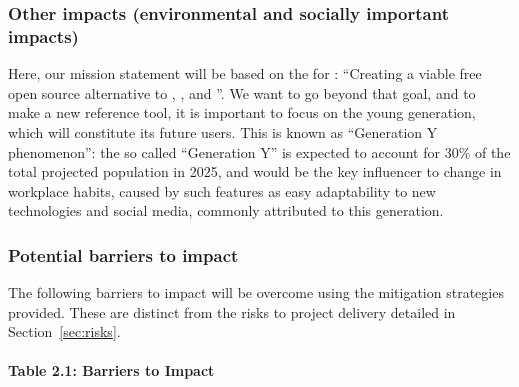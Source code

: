 \subsubsection{Other impacts (environmental and socially important impacts)}


Here, our mission statement will be based on the for \Sage: ``Creating
a viable free open source alternative to \Magma, \Maple, \Mathematica
and \Matlab''. We want to go beyond that goal, and to make \TheProject 
a new reference tool, it is important to focus on the young generation, 
which will constitute its future users. This is known as 
``Generation Y phenomenon'': the so called ``Generation Y'' is expected
to account for 30\% of the total projected population in 2025, and would
be the key influencer to change in workplace habits, caused by such 
features as easy adaptability to new technologies and social media, 
commonly attributed to this generation.


\subsubsection{Potential barriers to impact}

The following barriers to impact will be overcome using the mitigation
strategies provided. These are distinct from the risks to project delivery
detailed in Section~\ref{sec:risks}.
\paragraph{Table 2.1: Barriers to Impact}

\ \\

